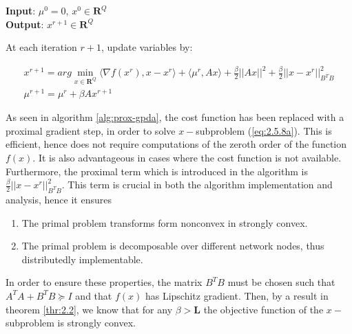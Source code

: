 \begin{algorithm}[H]
    \caption{The Proximal Gradient Primal Dual Algorithm (Prox-GPDA)}\label{alg:prox-gpda}
    \textbf{Input}: $\mu^0 = 0$, $x^0 \in \mathbf{R}^Q$\\
    \textbf{Output}: $x^{r+1} \in \mathbf{R}^Q$
    \begin{algorithmic}[1]
        \begin{flushleft}
            At each iteration $r+1$, update variables by:
        \end{flushleft}
        \begin{subequations}\label{eq:2.5.8}
            \begin{gather}
                x^{r+1} = arg \min_{x \in \mathbf{R}^Q} \langle \nabla f(x^r), x - x^r\rangle + \langle \mu^r, Ax\rangle + \frac{\beta}{2} ||Ax||^2 + \frac{\beta}{2}||x - x^r||^2_{B^TB}\label{eq:2.5.8a}\\
                \mu^{r+1} = \mu^r + \beta A x^{r+1}\label{eq:2.5.8b}
            \end{gather}
        \end{subequations}
    \end{algorithmic}
\end{algorithm}

As seen in algorithm \ref{alg:prox-gpda}, the cost function has been replaced with a proximal gradient step, in order to solve $x-$subproblem (\ref{eq:2.5.8a}). This is efficient, hence does not require computations of the zeroth order of the function $f(x)$. It is also advantageous in cases where the cost function is not available. Furthermore, the proximal term which is introduced in the algorithm is $\frac{\beta}{2}||x - x^r||^2_{B^TB}$. This term is crucial in both the algorithm implementation and analysis, hence it ensures
\begin{enumerate}
    \item The primal problem transforms form nonconvex in strongly convex.
    \item The primal problem is decomposable over different network nodes, thus distributedly implementable.
\end{enumerate}
In order to ensure these properties, the matrix $B^TB$ must be chosen such that $A^TA + B^TB \succeq I $ and that $f(x)$ has Lipschitz gradient. Then, by a result in theorem \ref{thr:2.2}, we know that for any $\beta > \mathbf{L}$ the objective function of the $x-$subproblem is strongly convex.

